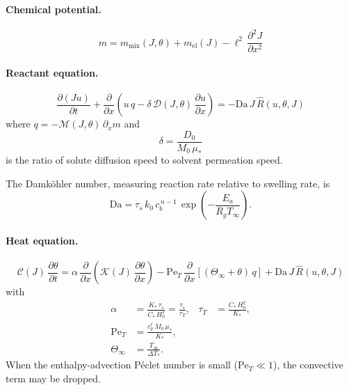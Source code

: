 \documentclass[aps,pre,reprint,superscriptaddress,longbibliography,floatfix]{revtex4-2}
\newcommand{\Ms}{\mathcal{M}}
\newcommand{\Ds}{\mathcal{D}}
\newcommand{\Cs}{\mathcal{C}}
\newcommand{\Ks}{\mathcal{K}}
\newcommand{\Da}{\mathrm{Da}}
\newcommand{\Pe}{\mathrm{Pe}}
\newcommand{\Rhat}{\widehat{R}}
\begin{document}
\paragraph{Chemical potential.}
\begin{equation}
  \boxed{
  m = m_\mathrm{mix}(J,\theta) + m_\mathrm{el}(J) - \ell^2\,\frac{\partial^2 J}{\partial x^2}
  }
  \label{eq:m_nondim_box}
\end{equation}

\paragraph{Reactant equation.}
\begin{equation}
  \boxed{
  \frac{\partial(J u)}{\partial t}
  + \frac{\partial}{\partial x}\!\left(u\,q - \delta\,\Ds(J,\theta)\,\frac{\partial u}{\partial x}\right)
  = -\Da\,J\,\Rhat(u,\theta,J)
  }
  \label{eq:u_nondim}
\end{equation}
where $q = -\Ms(J,\theta)\,\partial_x m$ and
\begin{equation}
  \delta = \frac{D_0}{M_0\,\mu_*}
\end{equation}
is the ratio of solute diffusion speed to solvent permeation speed.

The Damk\"ohler number, measuring reaction rate relative to swelling rate, is
\begin{equation}
  \Da = \tau_s\,k_0\,c_b^{\,n-1}\,\exp\!\left(-\frac{E_a}{R_g T_\infty}\right).
  \label{eq:Da}
\end{equation}

\paragraph{Heat equation.}
\begin{equation}
  \boxed{
  \Cs(J)\,\frac{\partial\theta}{\partial t}
  = \alpha\,\frac{\partial}{\partial x}\!\left(\Ks(J)\,\frac{\partial\theta}{\partial x}\right)
  - \Pe_T\,\frac{\partial}{\partial x}\!\left[(\Theta_\infty + \theta)\,q\right]
  + \Da\,J\,\Rhat(u,\theta,J)
  }
  \label{eq:theta_nondim}
\end{equation}
with
\begin{align}
  \alpha &= \frac{K_*\,\tau_s}{C_*\,H_0^2} = \frac{\tau_s}{\tau_T},
  &\tau_T &= \frac{C_*\,H_0^2}{K_*}, \label{eq:alpha} \\
  \Pe_T &= \frac{c_p^\ell\,M_0\,\mu_*}{K_*}, \label{eq:PeT} \\
  \Theta_\infty &= \frac{T_\infty}{\Delta T_*}. \label{eq:Theta_inf}
\end{align}
When the enthalpy-advection Péclet number is small ($\Pe_T \ll 1$), the convective term may be dropped.
\end{document}
